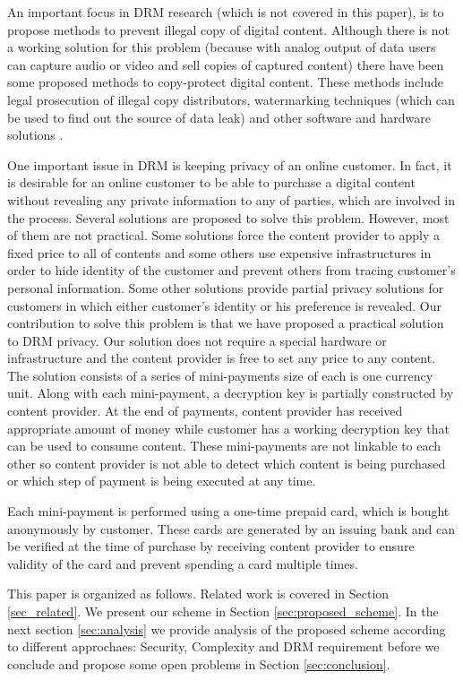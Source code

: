 \documentclass[times]{secauth}
\begin{document}
An important focus in DRM research (which is not covered in this paper), is to propose methods to prevent illegal copy of digital content. Although there is not a working solution for this problem (because with analog output of data users can capture audio or video and sell copies of captured content) there have been some proposed methods to copy-protect digital content. These methods include legal prosecution of illegal copy distributors, watermarking techniques (which can be used to find out the source of data leak) \cite{N24, N25, N9, N10, N13, N11} and other software and hardware solutions \cite{N26, N27}.

One important issue in DRM is keeping privacy of an online customer. In fact, it is desirable for an online customer to be able to purchase a digital content without revealing any private information to any of parties, which are involved in the process. Several solutions are proposed to solve this problem. However, most of them are not practical. Some solutions force the content provider to apply a fixed price to all of contents and some others use expensive infrastructures in order to hide identity of the customer and prevent others from tracing customer's personal information. Some other solutions provide partial privacy solutions for customers in which either customer's identity or his preference is revealed.
Our contribution to solve this problem is that we have proposed a practical solution to DRM privacy. Our solution does not require a special hardware or infrastructure and the content provider is free to set any price to any content. The solution consists of a series of mini-payments size of each is one currency unit. Along with each mini-payment, a decryption key is partially constructed by content provider. At the end of payments, content provider has received appropriate amount of money while customer has a working decryption key that can be used to consume content. These mini-payments are not linkable to each other so content provider is not able to detect which content is being purchased or which step of payment is being executed at any time.

Each mini-payment is performed using a one-time prepaid card, which is bought anonymously by customer. These cards are generated by an issuing bank and can be verified at the time of purchase by receiving content provider to ensure validity of the card and prevent spending a card multiple times. 

This paper is organized as follows. Related work is covered in Section \ref{sec_related}. We present our scheme in Section \ref{sec:proposed_scheme}. In the next section \ref{sec:analysis} we provide analysis of the proposed scheme according to different approchaes: Security, Complexity and DRM requirement before we conclude and propose some open problems in Section \ref{sec:conclusion}.
\end{document}
